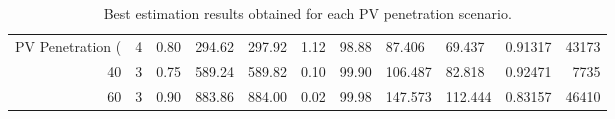 \begin{table}
\caption{Best estimation results obtained for each PV penetration scenario.}
\label{tab:best_results}
\begin{tabular}{rrllllllllr}
\toprule
PV Penetration (%
\midrule
20 & 4 & 0.80 & 294.62 & 297.92 & 1.12 & 98.88 & 87.406 & 69.437 & 0.91317 & 43173 \\
40 & 3 & 0.75 & 589.24 & 589.82 & 0.10 & 99.90 & 106.487 & 82.818 & 0.92471 & 7735 \\
60 & 3 & 0.90 & 883.86 & 884.00 & 0.02 & 99.98 & 147.573 & 112.444 & 0.83157 & 46410 \\
\bottomrule
\end{tabular}
\end{table}
